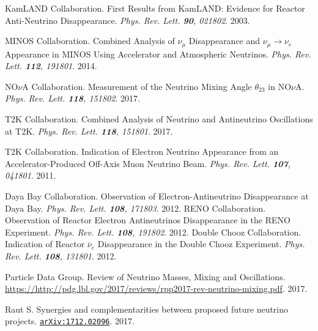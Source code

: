 \begin{thebibliography}{100}
	 KamLAND Collaboration.  First Results from KamLAND:
		Evidence for Reactor Anti-Neutrino Disappearance. \textit{Phys. Rev. Lett.
		\textbf{90}, 021802}. 2003.

	 MINOS Collaboration. Combined Analysis of $\nu_\mu$
		Disappearance and $\nu_\mu\rightarrow \nu_e$ Appearance in MINOS Using
		Accelerator and Atmospheric Neutrinos. \textit{Phys. Rev. Lett.
		\textbf{112}, 191801}. 2014.

	 NO$\nu$A Collaboration. Measurement of the Neutrino Mixing
		Angle $\theta_{23}$ in NO$\nu$A. \textit{Phys. Rev. Lett. \textbf{118},
		151802}. 2017.

	 T2K Collaboration. Combined Analysis of Neutrino and
		Antineutrino Oscillations at T2K. \textit{Phys. Rev. Lett.
		\textbf{118}, 151801}. 2017.

	 T2K Collaboration. Indication of Electron Neutrino
		Appearance from an Accelerator-Produced Off-Axis Muon Neutrino Beam.
		\textit{Phys. Rev. Lett. \textbf{107}, 041801}. 2011.


	 Daya Bay Collaboration. Observation of
		Electron-Antineutrino Disappearance at Daya Bay. \textit{Phys. Rev. Lett.
		\textbf{108}, 171803}. 2012.
	 RENO Collaboration. Observation of Reactor Electron
		Antineutrinos Disappearance in the RENO Experiment. \textit{Phys. Rev. Lett. \textbf{108},
		191802}. 2012.
	 Double Chooz Collaboration. Indication of Reactor
		$\overline{\nu}_e$ Disappearance in the Double Chooz Experiment.
		\textit{Phys. Rev. Lett. \textbf{108}, 131801}. 2012.


	 Particle Data Group. Review of Neutrino Masses, Mixing and
		Oscillations.
		\url{https://http://pdg.lbl.gov/2017/reviews/rpp2017-rev-neutrino-mixing.pdf}.
		2017.

	 Raut S. Synergies and complementarities between proposed
		future neutrino projects.
		\href{https://arxiv.org/abs/1712.02096v1}{\texttt{arXiv:1712.02096}}.
		2017.


\end{thebibliography}
